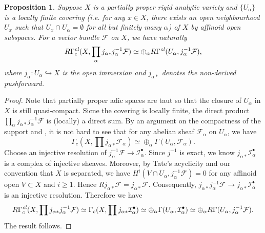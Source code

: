 \documentclass[a4paper,10pt]{amsart}
\theoremstyle{remark}
\theoremstyle{definition}
\theoremstyle{plain}
\newtheorem{proposition}[theorem]{Proposition}
\numberwithin{equation}{section}
\newcommand{\calF}{{\mathcal F}}
\newcommand{\cI}{{\mathcal I}}
\begin{document}
\begin{proposition}\label{propforDresolution} 
Suppose $X$ is a partially proper rigid analytic variety and $\{U_\alpha\}$ is a locally finite covering (i.e. for any $x\in X$, there exists an open neighbourhood $U_x$ such that $U_x\cap U_{\alpha}=\emptyset$ for all but finitely many $\alpha$) of $X$ by affinoid open subspaces. For a vector bundle $\calF$ on $X$, we have naturally
	$$R\Gamma_c^{\it cl}(X,\prod_{\alpha} j_{\alpha *}j^{-1}_{\alpha}\calF)\simeq \oplus_{\alpha} R\Gamma^{\it cl}(U_\alpha,j_{\alpha}^{-1}\calF),$$
where $j_{\alpha}:U_{\alpha}\hookrightarrow X$ is the open immersion and $j_{\alpha*}$ denotes the non-derived pushforward.
\end{proposition}
\begin{proof}
	Note that partially proper adic spaces are taut so that the closure of $U_\alpha$ in $X$ is still quasi-compact. Sicne the covering is locally finite, the direct product $\prod_{\alpha} j_{\alpha *}j^{-1}_{\alpha}\calF$ is (locally) a direct sum. By an argument on the compactness of the support and \cite[Def.~A.15]{li2026locallyanalyticvectorscompleted}, it is not hard to see that for any abelian sheaf $\calF_{\alpha}$ on $U_\alpha$, we have
	$$\Gamma_c(X,\prod j_{\alpha*}\calF_{\alpha})\simeq \oplus_{\alpha} \Gamma(U_\alpha,\calF_\alpha).$$
	Choose an injective resolution of $j^{-1}_{\alpha}\calF\to \cI_{\alpha}^\bullet$. Since $j^{-1}$ is exact, we know $j_{\alpha*}\cI_{\alpha}^\bullet$ is a complex of injective sheaves. Moreover, by Tate's acyclicity and our convention that $X$ is separated, we have $H^i(V\cap U_{\alpha},j_{\alpha}^{-1}\calF)=0$ for any affinoid open $V\subset X$ and $i\geq 1$. Hence $Rj_{\alpha*}\calF=j_{\alpha*}\calF$. Consequently, $j_{\alpha *}j^{-1}_{\alpha}\calF\to j_{\alpha*}\cI_{\alpha}^\bullet$ is an injective resolution. Therefore we have
	$$R\Gamma_c^{\it cl}(X,\prod j_{\alpha *}j^{-1}_{\alpha}\calF)\simeq \Gamma_c(X,\prod j_{\alpha*}\cI_{\alpha}^\bullet)\simeq \oplus_{\alpha} \Gamma(U_\alpha,\cI_{\alpha}^\bullet)\simeq \oplus_{\alpha} R\Gamma(U_\alpha,j_{\alpha}^{-1}\calF).$$
	The result follows.
\end{proof}
\end{document}

